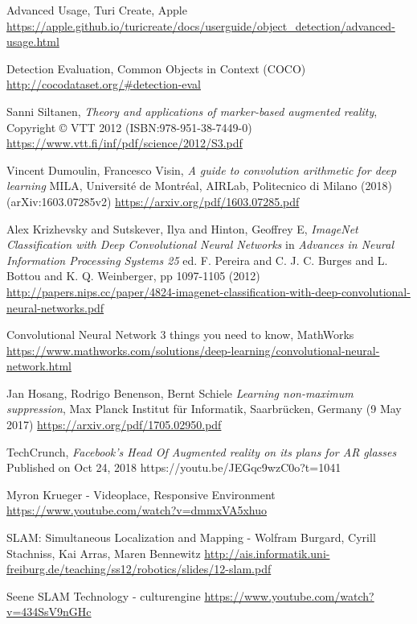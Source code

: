 
\begin{thebibliography}{X}

Advanced Usage, Turi Create, Apple
\url{https://apple.github.io/turicreate/docs/userguide/object_detection/advanced-usage.html}

Detection Evaluation, Common Objects in Context (COCO)
\url{http://cocodataset.org/#detection-eval}

Sanni Siltanen, \textit{Theory and applications of marker-based augmented reality},
Copyright © VTT 2012 (ISBN:978-951-38-7449-0)
\url{https://www.vtt.fi/inf/pdf/science/2012/S3.pdf}

Vincent Dumoulin, Francesco Visin, \textit{A guide to convolution arithmetic for deep learning}
 MILA, Universit\'e de Montr\'eal,
AIRLab, Politecnico di Milano (2018)
(arXiv:1603.07285v2)
\url{https://arxiv.org/pdf/1603.07285.pdf}


Alex Krizhevsky and Sutskever, Ilya and Hinton, Geoffrey E, \textit{ImageNet Classification with Deep Convolutional Neural Networks} in \textit{Advances in Neural Information Processing Systems 25} ed. F. Pereira and C. J. C. Burges and L. Bottou and K. Q. Weinberger, pp 1097-1105 (2012)
\url{http://papers.nips.cc/paper/4824-imagenet-classification-with-deep-convolutional-neural-networks.pdf}

Convolutional Neural Network 3 things you need to know, MathWorks
\url{https://www.mathworks.com/solutions/deep-learning/convolutional-neural-network.html}

Jan Hosang, Rodrigo Benenson, Bernt Schiele \textit{Learning non-maximum suppression}, Max Planck Institut für Informatik, Saarbrücken, Germany (9 May 2017)
\url{https://arxiv.org/pdf/1705.02950.pdf}

TechCrunch, \textit{Facebook's Head Of Augmented reality on its plans for AR glasses}
Published on Oct 24, 2018
https://youtu.be/JEGqc9wzC0o?t=1041

Myron Krueger - Videoplace, Responsive Environment
\url{https://www.youtube.com/watch?v=dmmxVA5xhuo}

SLAM: Simultaneous Localization and Mapping - Wolfram Burgard, Cyrill Stachniss, Kai Arras, Maren Bennewitz
\url{http://ais.informatik.uni-freiburg.de/teaching/ss12/robotics/slides/12-slam.pdf}

Seene SLAM Technology - culturengine
\url{https://www.youtube.com/watch?v=434SsV9nGHc}


\end{thebibliography}
